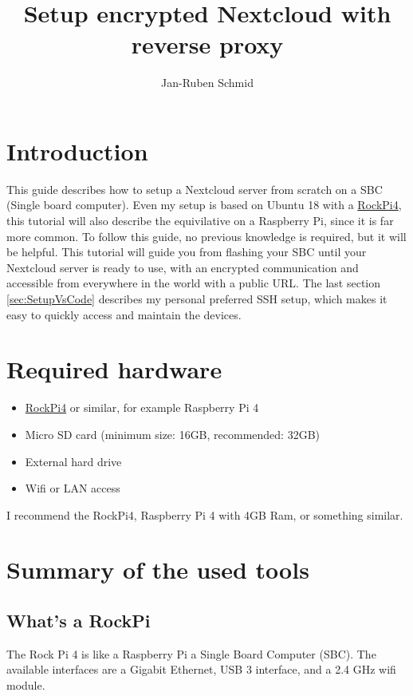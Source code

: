 \documentclass[a4paper,12pt]{article}
\begin{document}
	\title{Setup encrypted Nextcloud with reverse proxy}
	\author{Jan-Ruben Schmid}
	\maketitle
	\tableofcontents
	\pagebreak
	\section{Introduction}
	This guide describes how to setup a Nextcloud server from scratch on a SBC (Single board computer). Even my setup is based on Ubuntu 18 with a \href{https://rockpi.org/rockpi4}{RockPi4}, this tutorial will also describe the equivilative on a Raspberry Pi, since it is far more common.
	To follow this guide, no previous knowledge is required, but it will be helpful. \newline
	This tutorial will guide you from flashing your SBC until your Nextcloud server is ready to use, with an encrypted communication and accessible from everywhere in the world with a public URL.\newline
	The last section \ref{sec:SetupVsCode} describes my personal preferred SSH setup, which makes it easy to quickly access and maintain the devices. 
	\section{Required hardware}
	\begin{itemize}
		\item \href{https://rockpi.org/rockpi4}{RockPi4} or similar, for example Raspberry Pi 4
		\item Micro SD card (minimum size: 16GB, recommended: 32GB)
		\item External hard drive
		\item Wifi or LAN access
	\end{itemize}
	I recommend the RockPi4, Raspberry Pi 4 with 4GB Ram, or something similar.
	\section{Summary of the used tools}
	\subsection{What's a RockPi}
	The Rock Pi 4 is like a Raspberry Pi a Single Board Computer (SBC). The available interfaces are a Gigabit Ethernet, USB 3 interface, and a 2.4 GHz wifi module.
\end{document}
